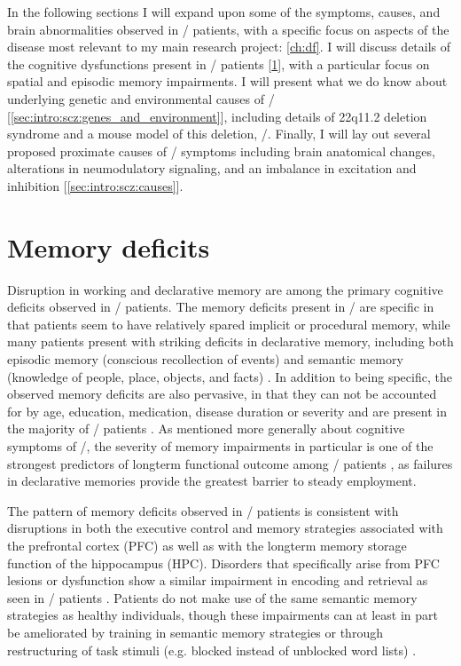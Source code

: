 In the following sections I will expand upon some of the symptoms, causes, and brain abnormalities observed in \scz/ patients, with a specific focus on aspects of the disease most relevant to my main research project: \autoref{ch:df}.
I will discuss details of the cognitive dysfunctions present in \scz/ patients [\ref{sec:intro:scz:memory}], with a particular focus on spatial and episodic memory impairments.
I will present what we do know about underlying genetic and environmental causes of \scz/ [\ref{sec:intro:scz:genes_and_environment}], including details of 22q11.2 deletion syndrome and a mouse model of this deletion, \df/.
Finally, I will lay out several proposed proximate causes of \scz/ symptoms including brain anatomical changes, alterations in neumodulatory signaling, and an imbalance in excitation and inhibition [\ref{sec:intro:scz:causes}].


\section{Memory deficits}\label{sec:intro:scz:memory}
Disruption in working and declarative memory are among the primary cognitive deficits observed in \scz/ patients.
The memory deficits present in \scz/ are specific in that patients seem to have relatively spared implicit or procedural memory, while many patients present with striking deficits in declarative memory, including both episodic memory (conscious recollection of events) and semantic memory (knowledge of people, place, objects, and facts) \citep{O'Carroll2000, Aleman1999, Gold2010}.
In addition to being specific, the observed memory deficits are also pervasive, in that they can not be accounted for by age, education, medication, disease duration or severity \citep{Ranganath2008} and are present in the majority of \scz/ patients \citep{}.
As mentioned more generally about cognitive symptoms of \scz/, the severity of memory impairments in particular is one of the strongest predictors of longterm functional outcome among \scz/ patients \citep{Green1996}, as failures in declarative memories provide the greatest barrier to steady employment.

The pattern of memory deficits observed in \scz/ patients is consistent with disruptions in both the executive control and memory strategies associated with the prefrontal cortex (PFC) as well as with the longterm memory storage function of the hippocampus (HPC).
Disorders that specifically arise from PFC lesions or dysfunction show a similar impairment in encoding and retrieval as seen in \scz/ patients \citep{Ranganath2008}.
Patients do not make use of the same semantic memory strategies as healthy individuals, though these impairments can at least in part be ameliorated by training in semantic memory strategies or through restructuring of task stimuli (e.g. blocked instead of unblocked word lists) \citep{Gold1992, Stone1998}.

